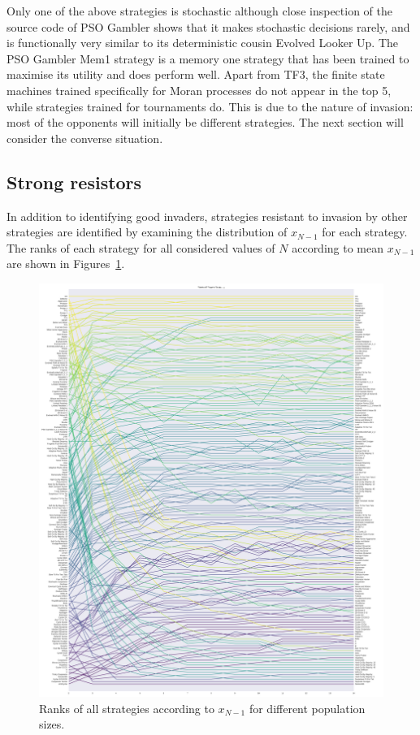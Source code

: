 \documentclass{article}
\begin{document}
Only one of the above strategies is stochastic although close inspection of the
source code of PSO Gambler shows that it makes stochastic decisions rarely, and
is functionally very similar to its deterministic cousin Evolved Looker Up.
The PSO Gambler Mem1 strategy is a memory one strategy that has been trained to
maximise its utility and does perform well.
Apart from TF3, the finite state machines trained specifically for
Moran processes do not appear in the top 5, while strategies trained for
tournaments do. This is due to the nature of invasion: most of the opponents
will initially be different strategies. The next section will consider the
converse situation.

\subsection{Strong resistors}\label{sec:strong_resistors}

In addition to identifying good invaders, strategies resistant to invasion by
other strategies are identified by examining the distribution of $x_{N-1}$ for
each strategy. The ranks of each strategy for all considered values of \(N\)
according to mean \(x_{N-1}\) are shown in
Figures~\ref{fig:ranks_v_size_resist}.

\begin{figure}[!hbtp]
    \centering
    \includegraphics[height=.9\textheight]{./img/average_rank_vs_population_size_resist.pdf}
    \caption{Ranks of all strategies according to \(x_{N-1}\) for different
    population sizes.}
    \label{fig:ranks_v_size_resist}
\end{figure}
\end{document}
